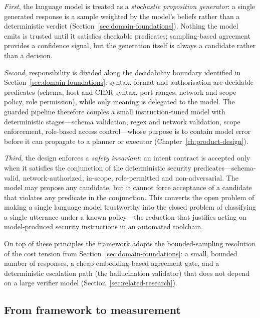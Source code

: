\emph{First}, the language model is treated as a \emph{stochastic proposition
generator}: a single generated response is a sample weighted by the model's
beliefs rather than a deterministic verdict
(Section~\ref{sec:domain-foundations}). Nothing the model emits is trusted until
it satisfies checkable predicates; sampling-based agreement
\parencite{wang2023selfconsistency} provides a confidence signal, but the
generation itself is always a candidate rather than a decision.

\emph{Second}, responsibility is divided along the decidability boundary
identified in Section~\ref{sec:domain-foundations}: syntax, format and
authorisation are decidable predicates (schema, host and CIDR syntax, port
ranges, network and scope policy, role permission), while only meaning is
delegated to the model. The guarded pipeline therefore couples a small
instruction-tuned model with deterministic stages---schema validation, regex and
network validation, scope enforcement, role-based access control---whose purpose
is to contain model error before it can propagate to a planner or executor
(Chapter~\ref{ch:product-design}).

\emph{Third}, the design enforces a \emph{safety invariant}: an intent contract
is accepted only when it satisfies the conjunction of the deterministic security
predicates---schema-valid, network-authorized, in-scope, role-permitted and
non-adversarial. The model may propose any candidate, but it cannot force
acceptance of a candidate that violates any predicate in the conjunction. This
converts the open problem of making a single language model trustworthy into the
closed problem of classifying a single utterance under a known policy---the
reduction that justifies acting on model-produced security instructions in an
automated toolchain.

On top of these principles the framework adopts the bounded-sampling resolution
of the cost tension from Section~\ref{sec:domain-foundations}: a small, bounded
number of responses, a cheap embedding-based agreement gate, and a deterministic
escalation path (the hallucination validator) that does not depend on a large
verifier model (Section~\ref{sec:related-research}).

\subsection*{From framework to measurement}

